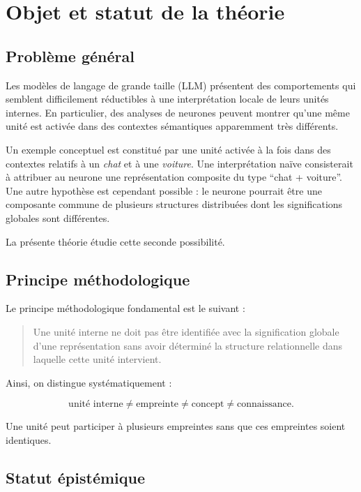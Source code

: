 \documentclass[11pt,a4paper]{article}
\begin{document}
\section{Objet et statut de la théorie}

\subsection{Problème général}

Les modèles de langage de grande taille (LLM) présentent des comportements
qui semblent difficilement réductibles à une interprétation locale de leurs
unités internes. En particulier, des analyses de neurones peuvent montrer
qu'une même unité est activée dans des contextes sémantiques apparemment très
différents.

Un exemple conceptuel est constitué par une unité activée à la fois dans des
contextes relatifs à un \emph{chat} et à une \emph{voiture}. Une interprétation
naïve consisterait à attribuer au neurone une représentation composite du type
``chat + voiture''. Une autre hypothèse est cependant possible : le neurone
pourrait être une composante commune de plusieurs structures distribuées dont
les significations globales sont différentes.

La présente théorie étudie cette seconde possibilité.

\subsection{Principe méthodologique}

Le principe méthodologique fondamental est le suivant :

\begin{quote}
Une unité interne ne doit pas être identifiée avec la signification globale
d'une représentation sans avoir déterminé la structure relationnelle dans
laquelle cette unité intervient.
\end{quote}

Ainsi, on distingue systématiquement :

\[
\text{unité interne}
\neq
\text{empreinte}
\neq
\text{concept}
\neq
\text{connaissance}.
\]

Une unité peut participer à plusieurs empreintes sans que ces empreintes
soient identiques.

\subsection{Statut épistémique}
\end{document}
